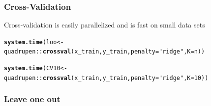 \documentclass[10pt, c, xcolor=x11names]{beamer}\usepackage[]{graphicx}\usepackage[]{color}
\makeatletter
\newcommand{\hlnum}[1]{\textcolor[rgb]{0.686,0.059,0.569}{#1}}%
\newcommand{\hlstr}[1]{\textcolor[rgb]{0.192,0.494,0.8}{#1}}%
\newcommand{\hlopt}[1]{\textcolor[rgb]{0,0,0}{#1}}%
\newcommand{\hlstd}[1]{\textcolor[rgb]{0.345,0.345,0.345}{#1}}%
\newcommand{\hlkwb}[1]{\textcolor[rgb]{0.69,0.353,0.396}{#1}}%
\newcommand{\hlkwc}[1]{\textcolor[rgb]{0.333,0.667,0.333}{#1}}%
\newcommand{\hlkwd}[1]{\textcolor[rgb]{0.737,0.353,0.396}{\textbf{#1}}}%
\newenvironment{kframe}{%
 \def\at@end@of@kframe{}%
 \ifinner\ifhmode%
  \def\at@end@of@kframe{\end{minipage}}%
  \begin{minipage}{\columnwidth}%
 \fi\fi%
 \def\FrameCommand##1{\hskip\@totalleftmargin \hskip-\fboxsep
 \colorbox{shadecolor}{##1}\hskip-\fboxsep
     \hskip-\linewidth \hskip-\@totalleftmargin \hskip\columnwidth}%
 \MakeFramed {\advance\hsize-\width
   \@totalleftmargin\z@ \linewidth\hsize
   \@setminipage}}%
 {\par\unskip\endMakeFramed%
 \at@end@of@kframe}
\newenvironment{knitrout}{}{} %
\makeatother
\begin{document}
\begin{frame}[containsverbatim]
  \frametitle{Cross-Validation}
  
  Cross-validation is easily parallelized and is fast on small data sets

\begin{knitrout}\scriptsize
{}\color{fgcolor}\begin{kframe}
\begin{alltt}
\hlkwd{system.time}\hlstd{(loo} \hlkwb{<-} \hlstd{quadrupen}\hlopt{::}\hlkwd{crossval}\hlstd{(x_train,y_train,} \hlkwc{penalty} \hlstd{=}  \hlstr{"ridge"}\hlstd{,} \hlkwc{K} \hlstd{= n))}
\end{alltt}


{\ttfamily\noindent\bfseries{}}\end{kframe}
\end{knitrout}

\begin{knitrout}\scriptsize
{}\color{fgcolor}\begin{kframe}
\begin{alltt}
\hlkwd{system.time}\hlstd{(CV10} \hlkwb{<-} \hlstd{quadrupen}\hlopt{::}\hlkwd{crossval}\hlstd{(x_train,y_train,} \hlkwc{penalty} \hlstd{=}  \hlstr{"ridge"}\hlstd{,} \hlkwc{K} \hlstd{=} \hlnum{10}\hlstd{))}
\end{alltt}


{\ttfamily\noindent\bfseries{}}\end{kframe}
\end{knitrout}

\end{frame}

\begin{frame}[containsverbatim]
  \frametitle{Leave one out}
\begin{knitrout}\scriptsize
{}\color{fgcolor}\begin{kframe}


{\ttfamily\noindent\bfseries{}}\end{kframe}
\end{knitrout}
\end{frame}
\end{document}
